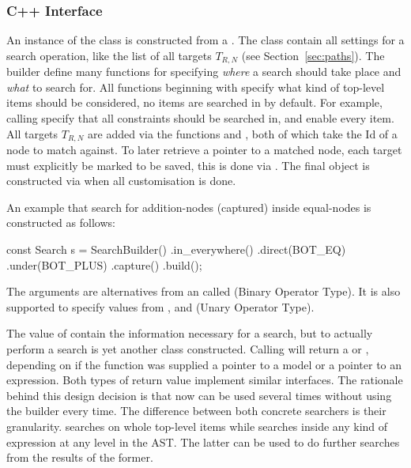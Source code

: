\documentclass[a4paper,12pt]{article}
\begin{document}
\subsubsection{C++ Interface}
\sloppy %

An instance of the  class is constructed from a . The
 class contain all settings for a search operation, like the list of all
targets $T_{R,N}$ (see Section~\ref{sec:paths}). The
builder define many functions for specifying \emph{where} a search should take place and
\emph{what} to search for. All functions beginning with  specify what kind of
top-level items should be considered, no items are searched in by default. For example, calling
 specify that all constraints should be searched in, and
 enable every item.
All targets $T_{R,N}$ are added via the functions  and , both of
which take the Id of a node to match against. To later
retrieve a pointer to a matched node, each target must explicitly be marked to
be saved, this is done via .
The final object is constructed via  when all customisation is done.

An example that search for addition-nodes (captured) inside equal-nodes is constructed as follows:
\begin{cppp}[style=nonumbers]
const Search s = SearchBuilder()
  .in_everywhere()
  .direct(BOT_EQ)
  .under(BOT_PLUS)
  .capture()
  .build();
\end{cppp}
The arguments are alternatives from an  called  (Binary Operator Type).
It is also supported to specify values from , and  (Unary
Operator Type).

The value of  contain the information necessary for a search, but to actually
perform a search is yet another class constructed. Calling  will return a
 or , depending on if the function was supplied
a pointer to a model or a pointer to an expression. Both types of return value implement
similar interfaces.
The rationale behind this design
decision is that  now can be used several times
without using the builder every time.
The difference between both concrete searchers is their granularity. 
searches on whole top-level items while  searches inside any kind
of expression at any level in the AST. The latter can be used to do further searches from
the results of the former.
\end{document}
